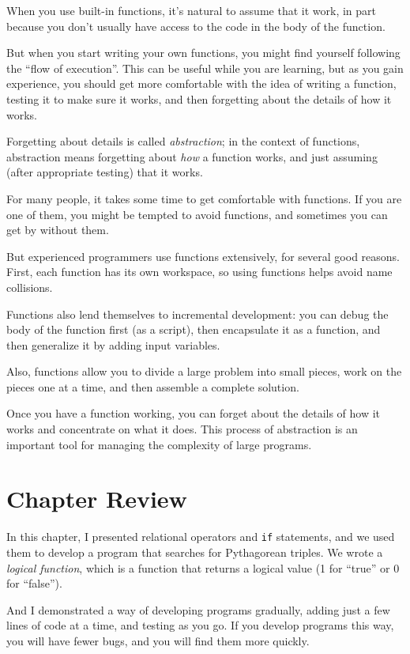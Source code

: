 When you use built-in functions, it's natural to assume that it work, in part because you don't
usually have access to the code in the body of the function.

But when you start writing your own functions, you might
find yourself following the ``flow of execution''.  This can
be useful while you are learning, but as you gain experience, you
should get more comfortable with the idea of writing a function,
testing it to make sure it works, and then forgetting about the
details of how it works.


Forgetting about details is called {\em abstraction}; in the context
of functions, abstraction means forgetting about {\em how} a function
works, and just assuming (after appropriate testing) that it works.

For many people, it takes some time to get comfortable with functions.  If you are one of them, you might be tempted to avoid functions, and sometimes you can get by without them.

But experienced programmers use functions extensively, for several good reasons. First, each function has its own workspace, so using functions helps
avoid name collisions. 

Functions also lend themselves to incremental development: you can
debug the body of the function first (as a script), then encapsulate
it as a function, and then generalize it by adding input variables.

Also, functions allow you to divide a large problem into small
pieces, work on the pieces one at a time, and then assemble a
complete solution. 

Once you have a function working, you can forget about the
details of how it works and concentrate on what it does.  This
process of abstraction is an important tool for managing the
complexity of large programs.


\section{Chapter Review}

In this chapter, I presented relational operators and {\tt if} statements, and we used them to develop a program that searches for Pythagorean triples.
We wrote a {\em logical function}, which is a function that returns a logical value
(1 for ``true'' or 0 for ``false'').

And I demonstrated a way of developing programs gradually, adding just a few lines of code at a time, and testing as you go.  If you develop programs this way, you will have fewer bugs, and you will find them more quickly.

